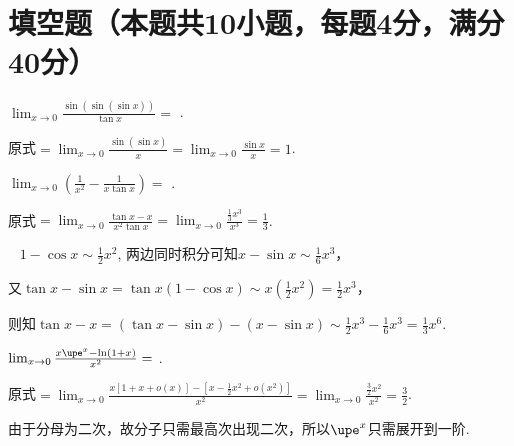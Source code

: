\documentclass{USTBExam}
\begin{document}
\maketitle

\section{填空题（本题共10小题，每题4分，满分40分）}

\begin{problem}
  $\lim _{x \to 0} \frac{\sin (\sin (\sin x))}{\tan x}=$
  \fillin[1].
\end{problem}

\begin{analysis}
  原式$=\lim_{x \to 0} \frac{\sin\left( \sin x \right)}{x} = \lim_{x \to 0} \frac{\sin x}{x} = 1$.
\end{analysis}

\begin{problem}
  $\lim _{x \to 0}\left(\frac{1}{x^{2}}-\frac{1}{x \tan x}\right)=$
  \fillin[$\frac{1}{3}$].
\end{problem}

\begin{analysis}
  原式$=\lim_{x \to 0} \frac{\tan x - x}{x^2 \tan x} = \lim_{x \to 0} \frac{\frac{1}{3}x^3}{x^3} = \frac{1}{3}$.

  \faMortarBoard~ $1 - \cos x \sim \frac{1}{2}x^2$, 两边同时积分可知$x - \sin x \sim \frac{1}{6}x^3$，

  又$\tan x - \sin x = \tan x \left( 1 - \cos x \right) \sim x \left( \frac{1}{2}x^2 \right) = \frac{1}{2}x^3$，

  则知$\tan x - x = \left( \tan x - \sin x \right) - \left( x - \sin x \right) \sim \frac{1}{2}x^3 - \frac{1}{6} x^3 = \frac{1}{3}x^6$.
\end{analysis}

\begin{problem}
  $\lim _{x \to 0} \frac{x \upe^{x}-\ln (1+x)}{x^{2}}=$
  \fillin[$\frac{3}{2}$].
\end{problem}

\begin{analysis}
  原式$=\lim_{x \to 0} \frac{x \left[ 1+x+o(x) \right] - \left[ x - \frac{1}{2}x^2 +o(x^2) \right]}{x^2} = \lim_{x \to 0} \frac{\frac{3}{2}x^2}{x^2} = \frac{3}{2}$.

  \faMortarBoard 由于分母为二次，故分子只需最高次出现二次，所以$\upe^x$只需展开到一阶.
\end{analysis}
\end{document}
